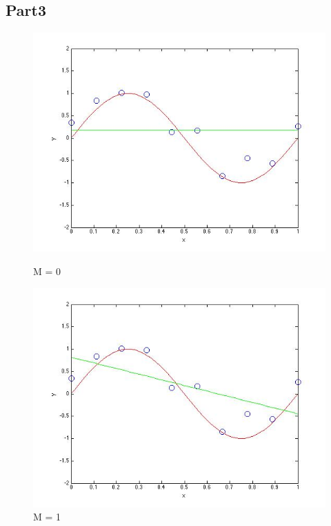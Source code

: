 \subsection{Part3}

\begin{figure}[!htb]
  \includegraphics[width=\linewidth]{figures/p2_M=0}
  \caption{M = 0}\label{fig:figures/p2_M=0}
\endminipage\hfill
{}
  \includegraphics[width=\linewidth]{figures/p2_M=1}
  \caption{M = 1}\label{fig:figures/p2_M=1}
\endminipage\hfill
{}                                                                            

\end{figure}
